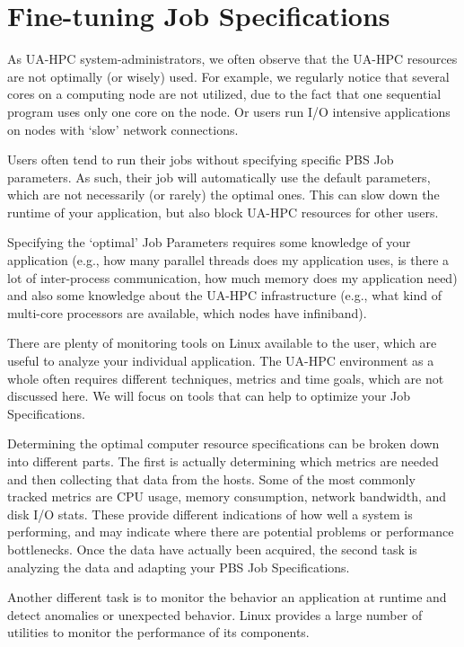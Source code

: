\chapter{Fine-tuning Job Specifications}

As UA-HPC system-administrators, we often observe that the UA-HPC resources are not optimally (or wisely) used. For example, we regularly notice that several cores on a computing node are not utilized, due to the fact that one sequential program uses only one core on the node. Or users run I/O intensive applications on nodes with `slow' network connections.

Users often tend to run their jobs without specifying specific PBS Job parameters.  As such, their job will automatically use the default parameters, which are not necessarily (or rarely) the optimal ones.  This can slow down the runtime of your application, but also block UA-HPC resources for other users.

Specifying the `optimal' Job Parameters requires some knowledge of your application (e.g., how many parallel threads does my application uses, is there a lot of inter-process communication, how much memory does my application need) and also some knowledge about the UA-HPC infrastructure (e.g., what kind of multi-core processors are available, which nodes have infiniband).

There are plenty of monitoring tools on Linux available to the user, which are useful to analyze your individual application. The UA-HPC environment as a whole often requires different techniques, metrics and time goals, which are not discussed here. We will focus on tools that can help to optimize your Job Specifications.

Determining the optimal computer resource specifications can be broken down into different parts. The first is actually determining which metrics are needed and then collecting that data from the hosts. Some of the most commonly tracked metrics are CPU usage, memory consumption, network bandwidth, and disk I/O stats. These provide different indications of how well a system is performing, and may indicate where there are potential problems or performance bottlenecks. Once the data have actually been acquired, the second task is analyzing the data and adapting your PBS Job Specifications.

Another different task is to monitor the behavior an application at runtime and detect anomalies or unexpected behavior. Linux provides a large number of utilities to monitor the performance of its components.

